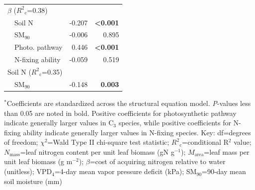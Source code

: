 \begin{table}
\begin{tabular}{p{0.5cm}p{3cm}p{1.5cm}p{1.5cm}}
            \multicolumn{2}{l}{$\beta$ ($R^2{}_\mathrm{c}$=0.38)} && \\
            & \multicolumn{1}{l}{Soil N} & \multicolumn{1}{r}{-0.207} & \multicolumn{1}{r}{\textbf{<0.001}} \\
            & \multicolumn{1}{l}{SM$_{90}$} & \multicolumn{1}{r}{-0.006} & \multicolumn{1}{r}{0.895} \\
            & \multicolumn{1}{l}{Photo. pathway} & \multicolumn{1}{r}{0.446} & \multicolumn{1}{r}{\textbf{<0.001}} \\
            & \multicolumn{1}{l}{N-fixing ability} & \multicolumn{1}{r}{-0.059} & \multicolumn{1}{r}{0.519} \\
            \hline

            \multicolumn{2}{l}{Soil N ($R^2{}_\mathrm{c}$=0.35)} && \\
            & \multicolumn{1}{l}{SM$_{90}$} & \multicolumn{1}{r}{-0.148} & \multicolumn{1}{r}{\textbf{0.003}} \\
            \hline

        \end{tabular}%
        \label{tab:table4.5}
    \end{table}
\begin{singlespace}
    \noindent $^*$Coefficients are standardized across the structural equation model. \textit{P}-values less than 0.05 are noted in bold. Positive coefficients for photosynthetic pathway indicate generally larger values in C$_3$ species, while positive coefficients for N-fixing ability indicate generally larger values in N-fixing species. Key: df=degrees of freedom; $\chi^2$=Wald Type II chi-square test statistic; $R^2{}_\mathrm{c}$=conditional R$^2$ value; $N_\mathrm{mass}$=leaf nitrogen content per unit leaf biomass (gN g$^{-1}$); $M_\mathrm{area}$=leaf mass per unit leaf biomass (g m$^{-2}$); $\beta$=cost of acquiring nitrogen relative to water (unitless); VPD$_4$=4-day mean vapor pressure deficit (kPa); SM$_{90}$=90-day mean soil moisture (mm)
\end{singlespace}
\clearpage

